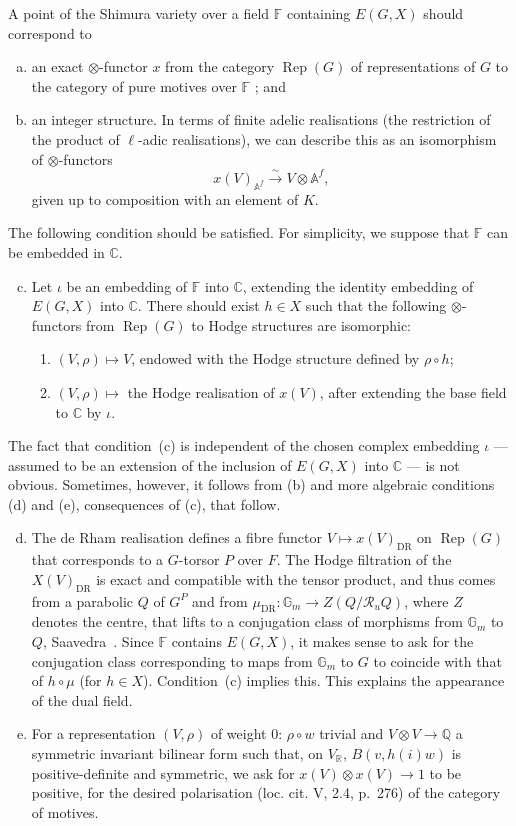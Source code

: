 \documentclass{article}
\theoremstyle{plain}
\theoremstyle{definition}
\newcommand{\QQ}{\mathbb{Q}}
\newcommand{\CC}{\mathbb{C}}
\newcommand{\RR}{\mathbb{R}}
\renewcommand{\AA}{\mathbb{A}}
\newcommand{\GG}{\mathbb{G}}
\newcommand{\FF}{\mathbb{F}}
\DeclareMathOperator{\Rep}{Rep}
\newcommand{\oldpage}[1]{\marginpar{\footnotesize$\Big\vert$ \textit{p.~#1}}}
\begin{document}
A point of the Shimura variety over a field $\FF$ containing $E(G,X)$ should correspond to
\begin{enumerate}[(a)]
  \item an exact $\otimes$-functor $x$ from the category $\Rep(G)$ of representations of $G$ to the category of pure motives over $\FF$ ; and
  \item an integer structure.
    In terms of finite adelic realisations (the restriction of the product of $\ell$-adic realisations), we can describe this as an isomorphism of $\otimes$-functors
    \[
      x(V)_{\AA^f} \xrightarrow{\sim} V\otimes\AA^f,
    \]
    given up to composition with an element of $K$.
\end{enumerate}
The following condition should be satisfied.
For simplicity, we suppose that $\FF$ can be embedded in $\CC$.
\begin{enumerate}[(a)]
\setcounter{enumi}{2}
  \item Let $\iota$ be an embedding of $\FF$ into $\CC$, extending the identity embedding of $E(G,X)$ into $\CC$.
    There should exist $h\in X$ such that the following $\otimes$-functors from $\Rep(G)$ to Hodge structures are isomorphic:
    \begin{enumerate}[(1)]
      \item $(V,\rho)\mapsto V$, endowed with the Hodge structure defined by $\rho\circ h$;
      \item $(V,\rho)\mapsto$ the Hodge realisation of $x(V)$, after extending the base field to $\CC$ by $\iota$.
    \end{enumerate}
\end{enumerate}
The fact that condition~(c) is independent of the chosen complex embedding $\iota$ --- assumed to be an extension of the inclusion of $E(G,X)$ into $\CC$ --- is not obvious.
Sometimes, however, it follows from (b) and more algebraic conditions (d) and (e), consequences of (c), that follow.
\begin{enumerate}[(a)]
\setcounter{enumi}{3}
  \item The de Rham realisation defines a fibre functor $V\mapsto x(V)_{\mathrm{DR}}$ on $\Rep(G)$ that corresponds to a $G$-torsor $P$ over $F$.
    The Hodge filtration of the $X(V)_{\mathrm{DR}}$ is exact and compatible with the tensor product,
\oldpage{151}
    and thus comes from a parabolic $Q$ of $G^P$ and from $\mu_{\mathrm{DR}}\colon\GG_m\to Z(Q/\mathscr{R}_uQ)$, where $Z$ denotes the centre, that lifts to a conjugation class of morphisms from $\GG_m$ to $Q$, Saavedra~\cite[IV, 2.4, p.~229]{28}.
    Since $\FF$ contains $E(G,X)$, it makes sense to ask for the conjugation class corresponding to maps from $\GG_m$ to $G$ to coincide with that of $h\circ\mu$ (for $h\in X$).
    Condition~(c) implies this.
    This explains the appearance of the dual field.
  \item For a representation $(V,\rho)$ of weight $0$: $\rho\circ w$ trivial and $V\otimes V\to\QQ$ a symmetric invariant bilinear form such that, on $V_\RR$, $B(v,h(i)w)$ is positive-definite and symmetric, we ask for $x(V)\otimes x(V)\to 1$ to be positive, for the desired polarisation (loc. cit. V, 2.4, p.~276) of the category of motives.
\end{enumerate}
\end{document}
